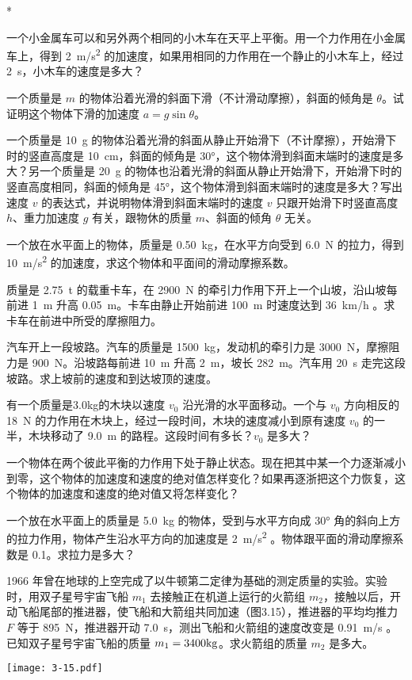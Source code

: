 \begin{Exercise}*
\begin{question}
  \item 一个小金属车可以和另外两个相同的小木车在天平上平衡。用一个力作用在小金属车上，得到 \qty{2}{m/s^2} 的加速度，如果用相同的力作用在一个静止的小木车上，经过 \qty{2}{s}，小木车的速度是多大？
  \item  一个质量是 $m$ 的物体沿着光滑的斜面下滑（不计滑动摩擦），斜面的倾角是 $\theta$。试证明这个物体下滑的加速度 $a=g\sin\theta$。
  \item  一个质量是 \qty{10}{g} 的物体沿着光滑的斜面从静止开始滑下（不计摩擦），开始滑下时的竖直高度是 \qty{10}{cm}，斜面的倾角是 \ang{30}，这个物体滑到斜面末端时的速度是多大？另一个质量是 \qty{20}{g} 的物体也沿着光滑的斜面从静止开始滑下，开始滑下时的竖直高度相同，斜面的倾角是 \ang{45}，这个物体滑到斜面末端时的速度是多大？写出速度 $v$ 的表达式，并说明物体滑到斜面末端时的速度 $v$ 只跟开始滑下时竖直高度 $h$、重力加速度 $g$ 有关，跟物休的质量 $m$、斜面的倾角 $\theta$ 无关。
\item  一个放在水平面上的物体，质量是 \qty{0.50}{kg}，在水平方向受到 \qty{6.0}{N} 的拉力，得到 \qty{10}{m/s^2} 的加速度，求这个物体和平面间的滑动摩擦系数。
\item 质量是 \qty{2.75}{t} 的载重卡车，在 \qty{2900}{N} 的牵引力作用下开上一个山坡，沿山坡每前进 \qty{1}{m} 升高 \qty{0.05}{m}。卡车由静止开始前进 \qty{100}{m} 时速度达到 \qty{36}{km/h} 。求卡车在前进中所受的摩擦阻力。
\item  汽车开上一段坡路。汽车的质量是 \qty{1500}{kg}，发动机的牵引力是 \qty{3000}{N}，摩擦阻力是 \qty{900}{N}。沿坡路每前进 \qty{10}{m} 升高 \qty{2}{m}，坡长 \qty{282}{m}。汽车用 \qty{20}{s} 走完这段坡路。求上坡前的速度和到达坡顶的速度。
\item  有一个质量是{3.0}{kg}的木块以速度 $v_0$ 沿光滑的水平面移动。一个与 $v_0$ 方向相反的 \qty{18}{N} 的力作用在木块上，经过一段时间，木块的速度减小到原有速度 $v_0$ 的一半，木块移动了 \qty{9.0}{m} 的路程。这段时间有多长？$v_0$ 是多大？
\item  一个物体在两个彼此平衡的力作用下处于静止状态。现在把其中某一个力逐渐减小到零，这个物体的加速度和速度的绝对值怎样变化？如果再逐浙把这个力恢复，这个物体的加速度和速度的绝对值又将怎样变化？
\item  一个放在水平面上的质量是 \qty{5.0}{kg} 的物体，受到与水平方向成 \ang{30} 角的斜向上方的拉力作用，物体产生沿水平方向的加速度是 \qty{2}{m/s^2} 。物体跟平面的滑动摩擦系数是 0.1。求拉力是多大？
\item\label{qn:rocket_test}  1966 年曾在地球的上空完成了以牛顿第二定律为基础的测定质量的实验。实验时，用双子星号宇宙飞船 $m_1$ 去接触正在机道上运行的火箭组 $m_2$，接触以后，开动飞船尾部的推进器，使飞船和大箭组共同加速（图3.15），推进器的平均均推力 $F$ 等于 \qty{895}{N}，推进器开动 \qty{7.0}{s}，测出飞船和火箭组的速度改变是 \qty{0.91}{m/s} 。已知双子星号宇宙飞船的质量 $m_1=3400{\rm kg}$。求火箭组的质量 $m_2$ 是多大。
\begin{figurehere}
  \begin{minipage}{\linewidth}\centering
    \texttt{[image: 3-15.pdf]}
    \caption{}\label{fig:3-15}
  \end{minipage}
\end{figurehere}


\end{question}
\end{Exercise}
